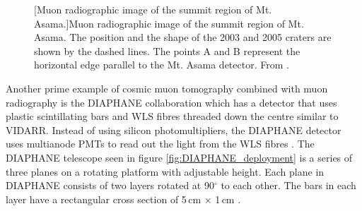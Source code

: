 \begin{figure}[!h]
\begin{minipage}{.45\textwidth}
  [Muon radiographic image of the summit region of Mt. Asama.]{Muon radiographic image of the summit region of Mt. Asama. The position and the shape of the 2003 and 2005 craters are shown by the dashed lines. The points A and B represent the horizontal edge parallel to the Mt. Asama detector. From \cite{Tanaka_mtAsama_2007}.}
  \label{fig:mtAsma3dMap}
  \vspace{0.478cm}
\end{minipage}
\end{figure}

Another prime example of cosmic muon tomography combined with muon radiography is the DIAPHANE collaboration which has a detector that uses plastic scintillating bars and WLS fibres threaded down the centre similar to VIDARR. Instead of using silicon photomultipliers, the DIAPHANE detector uses multianode PMTs to read out the light from the WLS fibres \cite{Marteau_2017}. The DIAPHANE telescope seen in figure \ref{fig:DIAPHANE_deployment} is a series of three planes on a rotating platform with adjustable height. Each plane in DIAPHANE consists of two layers rotated at 90$^\circ$ to each other. The bars in each layer have a rectangular cross section of 5\,cm $\times$ 1\,cm \cite{MARTEAU201223}. 
